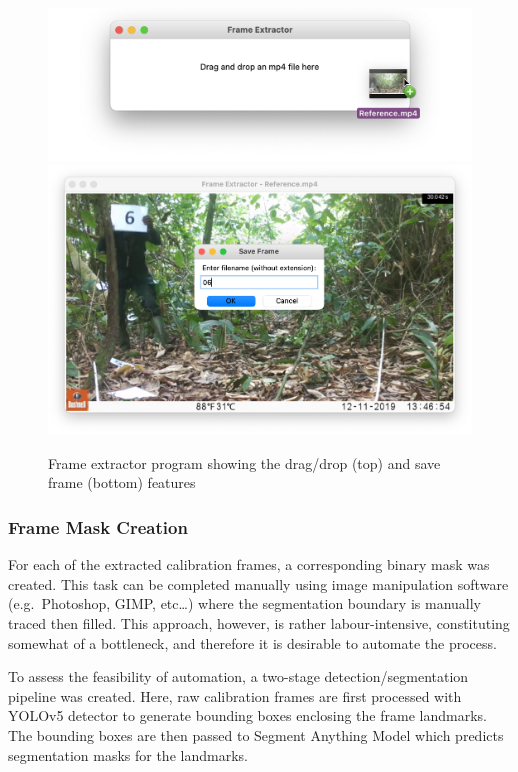 \begin{figure}[htbp]
    \centering
    \includegraphics[scale=0.5]{body/experimental/assets/frame_extractor/drag_drop}
    \vspace{-3mm}
    \includegraphics[scale=0.5]{body/experimental/assets/frame_extractor/save_frame}
    \caption{Frame extractor program showing the drag/drop (top) and save frame (bottom) features}
    \label{fig:frame_extractor}
\end{figure}

\clearpage

\subsubsection{Frame Mask Creation}\label{subsubsec:mask_creation}

For each of the extracted calibration frames, a corresponding binary mask was created.
This task can be completed manually using image manipulation software (e.g.\ Photoshop,
GIMP, etc\ldots) where the segmentation boundary is manually traced then filled.
This approach, however, is rather labour-intensive, constituting somewhat
of a bottleneck, and therefore it is desirable to automate the process.

To assess the feasibility of automation, a two-stage detection/segmentation pipeline was
created.
Here, raw calibration frames are first processed with YOLOv5 detector\cite{YOLO} to
generate bounding boxes enclosing the frame landmarks.
The bounding boxes are then passed to Segment Anything Model which predicts segmentation
masks for the landmarks.

